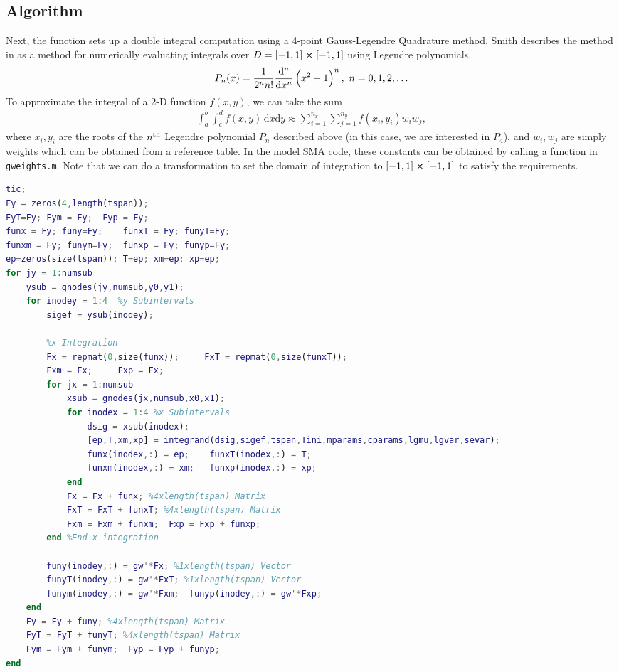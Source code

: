 \begin{multicols}{2}
\subsection{Algorithm}
Next, the function sets up a double integral computation using a 4-point Gauss-Legendre Quadrature method. Smith describes the method in \cite{smith2005smart} as a method for numerically evaluating integrals over $D=\sbr{-1,1}\cross\sbr{-1,1}$ using Legendre polynomials,
\begin{align}
    P_n(x)=\frac{1}{2^n n!}\dv[n]{}{x} \del{x^2-1}^n,\ n=0,1,2,\ldots
\end{align}
To approximate the integral of a 2-D function $f(x,y)$, we can take the sum
\begin{align}
    \int_a^b\int_c^d f(x,y)\,\mathrm{d}x\mathrm{d}y\approx \sum_{i=1}^{n_x}\sum_{j=1}^{n_y}f(x_i,y_i)w_iw_j,
\end{align}
where $x_i,y_i$ are the roots of the $n\textsuperscript{th}$ Legendre polynomial $P_n$ described above (in this case, we are interested in $P_4$), and $w_i,w_j$ are simply weights which can be obtained from a reference table. In the model SMA code, these constants can be obtained by calling a function in \texttt{gweights.m}. Note that we can do a transformation to set the domain of integration to $\sbr{-1,1}\cross\sbr{-1,1}$ to satisfy the requirements.
\begin{lstlisting}[language=matlab, caption=Snippet of main integrationn loop,label=codecode]
%%Double Integration
tic; 
Fy = zeros(4,length(tspan)); 
FyT=Fy; Fym = Fy;  Fyp = Fy;
funx = Fy; funy=Fy;    funxT = Fy; funyT=Fy;
funxm = Fy; funym=Fy;  funxp = Fy; funyp=Fy;
ep=zeros(size(tspan)); T=ep; xm=ep; xp=ep;
for jy = 1:numsub
    ysub = gnodes(jy,numsub,y0,y1);
    for inodey = 1:4  %y Subintervals
        sigef = ysub(inodey);
        
        %x Integration
        Fx = repmat(0,size(funx));     FxT = repmat(0,size(funxT));
        Fxm = Fx;     Fxp = Fx;
        for jx = 1:numsub
            xsub = gnodes(jx,numsub,x0,x1);
            for inodex = 1:4 %x Subintervals
                dsig = xsub(inodex);
				[ep,T,xm,xp] = integrand(dsig,sigef,tspan,Tini,mparams,cparams,lgmu,lgvar,sevar);
				funx(inodex,:) = ep; 	funxT(inodex,:) = T;
				funxm(inodex,:) = xm;	funxp(inodex,:) = xp;
			end
            Fx = Fx + funx; %4xlength(tspan) Matrix
            FxT = FxT + funxT; %4xlength(tspan) Matrix
			Fxm = Fxm + funxm;  Fxp = Fxp + funxp; 
        end %End x integration
        
        funy(inodey,:) = gw'*Fx; %1xlength(tspan) Vector
        funyT(inodey,:) = gw'*FxT; %1xlength(tspan) Vector
        funym(inodey,:) = gw'*Fxm;  funyp(inodey,:) = gw'*Fxp; 
    end
    Fy = Fy + funy; %4xlength(tspan) Matrix
    FyT = FyT + funyT; %4xlength(tspan) Matrix
	Fym = Fym + funym;  Fyp = Fyp + funyp; 
end
\end{lstlisting}


\end{multicols}
